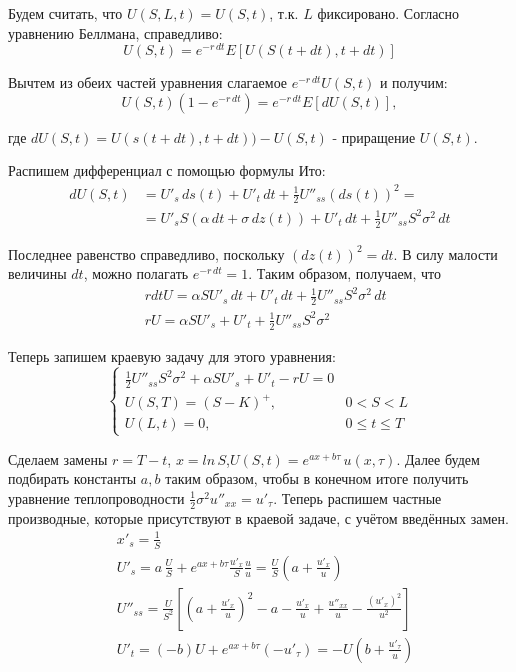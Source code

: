\documentclass[oneside,final,12pt]{article}
\begin{document}
Будем считать, что $U(S,L,t)=U(S,t)$, т.к. $L$ фиксировано. Согласно уравнению Беллмана, справедливо:
$$
U(S,t) = e^{-r \, dt} E[U(S(t+dt),t+dt)]
$$

Вычтем из обеих частей уравнения слагаемое $e^{-r \, dt} U(S,t)$ и получим:
$$
U(S,t)(1-e^{-r \, dt}) = e^{-r \, dt} E[dU(S,t)],
$$

\noindent
где $dU(S,t) = U(s(t+dt),t+dt)) - U(S,t)$ - приращение $U(S,t)$.

Распишем дифференциал с помощью формулы Ито:
\begin{align*}
    dU(S,t) & =  U'_s \, ds(t) + U'_t \, dt + \frac{1}{2} U''_{ss} (ds(t))^2 = \\
    & = U'_s S (\alpha \, dt + \sigma \, dz(t)) + U'_t \, dt + \frac{1}{2} U''_{ss} S^2 \sigma^2 \, dt
\end{align*}

Последнее равенство справедливо, поскольку $(dz(t))^2=dt$. В силу малости величины $dt$, можно полагать $e^{-r\, dt}=1$. Таким образом, получаем, что
\begin{align*}
& r dt U = \alpha S U'_s \, dt + U'_t \, dt + \frac{1}{2} U''_{ss} S^2 \sigma^2 \, dt \\
& rU = \alpha S U'_s + U'_t + \frac{1}{2} U''_{ss} S^2 \sigma^2
\end{align*}

Теперь запишем краевую задачу для этого уравнения:
$$
\begin{cases}
\frac{1}{2} U''_{ss} S^2 \sigma^2+\alpha S U'_s+ U'_t-rU=0 \\
U(S,T)=(S-K)^+ ,&0<S<L\\
U(L,t)=0 ,&0\leq t \leq T
\end{cases}
$$

Сделаем замены $r=T-t$, \quad $x=ln \, S$,\quad $U(S,t)=e^{ax+b\tau} \, u(x,\tau)$. Далее будем подбирать константы $a,b$ таким образом, чтобы в конечном итоге получить уравнение теплопроводности $\frac{1}{2}\sigma^2 u''_{xx} = u'_\tau$. Теперь распишем частные производные, которые присутствуют в краевой задаче, с учётом введённых замен.
\begin{align*}
    & x'_s = \frac{1}{S} \\
    & U'_s = a \, \frac{U}{S} + e^{ax+b\tau} \frac{u'_x}{S} \frac{u}{u} = \frac{U}{S} (a+\frac{u'_x}{u}) \\
    & U''_{ss} = \frac{U}{S^2} \left[ \left(a+\frac{u'_x}{u}\right)^2 - a - \frac{u'_x}{u} + \frac{u''_{xx}}{u} - \frac{(u'_x)^2}{u^2}\right] \\
    & U'_t = (-b)U + e^{ax+b\tau}(-u'_\tau) = -U(b+\frac{u'_\tau}{u})
\end{align*}
\end{document}
